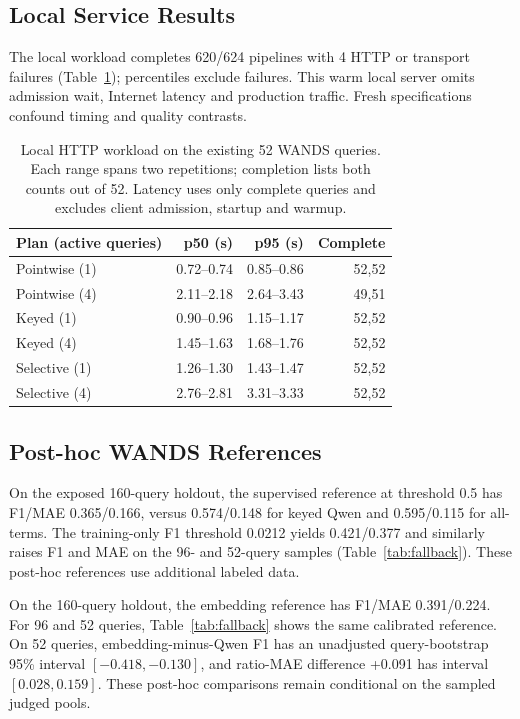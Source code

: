 \documentclass[conference]{IEEEtran}
\begin{document}
\subsection{Local Service Results}
The local workload completes 620/624 pipelines with 4 HTTP or transport failures (Table~\ref{tab:local_service}); percentiles exclude failures. This warm local server omits admission wait, Internet latency and production traffic. Fresh specifications confound timing and quality contrasts.

\begin{table}[t]
\caption{Local HTTP workload on the existing 52 WANDS queries. Each range spans two repetitions; completion lists both counts out of 52. Latency uses only complete queries and excludes client admission, startup and warmup.}
\label{tab:local_service}
\centering\footnotesize
\begin{tabular}{lrrr}
\toprule
Plan (active queries) & p50 (s) & p95 (s) & Complete \\
\midrule
Pointwise (1) & 0.72--0.74 & 0.85--0.86 & 52,52 \\
Pointwise (4) & 2.11--2.18 & 2.64--3.43 & 49,51 \\
Keyed (1) & 0.90--0.96 & 1.15--1.17 & 52,52 \\
Keyed (4) & 1.45--1.63 & 1.68--1.76 & 52,52 \\
Selective (1) & 1.26--1.30 & 1.43--1.47 & 52,52 \\
Selective (4) & 2.76--2.81 & 3.31--3.33 & 52,52 \\
\bottomrule
\end{tabular}
\end{table}

\subsection{Post-hoc WANDS References}
On the exposed 160-query holdout, the supervised reference at threshold 0.5 has F1/MAE 0.365/0.166, versus 0.574/0.148 for keyed Qwen and 0.595/0.115 for all-terms. The training-only F1 threshold 0.0212 yields 0.421/0.377 and similarly raises F1 and MAE on the 96- and 52-query samples (Table~\ref{tab:fallback}). These post-hoc references use additional labeled data.

On the 160-query holdout, the embedding reference has F1/MAE 0.391/0.224. For 96 and 52 queries, Table~\ref{tab:fallback} shows the same calibrated reference. On 52 queries, embedding-minus-Qwen F1 has an unadjusted query-bootstrap 95\% interval $[-0.418,-0.130]$, and ratio-MAE difference +0.091 has interval $[0.028,0.159]$. These post-hoc comparisons remain conditional on the sampled judged pools.
\end{document}
